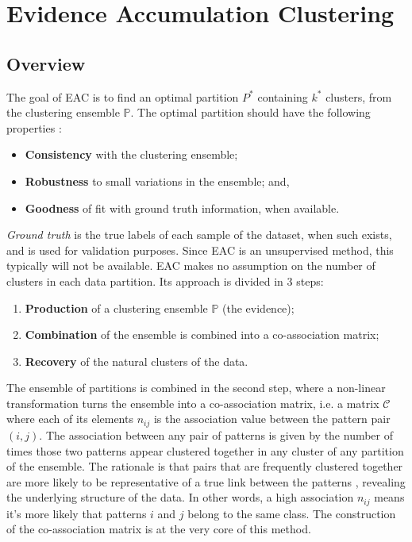 
\section{Evidence Accumulation Clustering}
\label{sec:eac}

\subsection{Overview}

The goal of EAC is to find an optimal partition $P^*$ containing $k^*$ clusters, from the clustering ensemble $\mathbb{P}$. The optimal partition should have the following properties \cite{Fred2005}:

\begin{itemize}
    \item \textbf{Consistency} with the clustering ensemble;
    \item \textbf{Robustness} to small variations in the ensemble; and,
    \item \textbf{Goodness} of fit with ground truth information, when available.
\end{itemize}

\emph{Ground truth} is the true labels of each sample of the dataset, when such exists, and is used for validation purposes.
Since EAC is an unsupervised method, this typically will not be available.
EAC makes no assumption on the number of clusters in each data partition.
Its approach is divided in 3 steps:

\begin{enumerate}
\item \textbf{Production} of a clustering ensemble $\mathbb{P}$ (the evidence);
\item \textbf{Combination} of the ensemble is combined into a co-association matrix;
\item \textbf{Recovery} of the natural clusters of the data.
\end{enumerate}

The ensemble of partitions is combined in the second step, where a non-linear transformation turns the ensemble into a co-association matrix, i.e. a matrix $\mathcal{C}$ where each of its elements $n_{ij}$ is the association value between the pattern pair $(i,j)$.
The association between any pair of patterns is given by the number of times those two patterns appear clustered together in any cluster of any partition of the ensemble.
The rationale is that pairs that are frequently clustered together are more likely to be representative of a true link between the patterns \cite{Fred2005}, revealing the underlying structure of the data.
In other words, a high association $n_{ij}$ means it's more likely that patterns $i$ and $j$ belong to the same class.
The construction of the co-association matrix is at the very core of this method.

